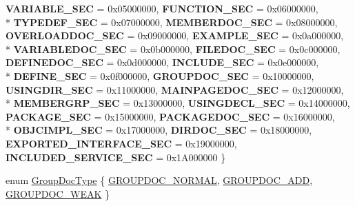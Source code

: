 \begin{DoxyCompactItemize}
{\bfseries V\-A\-R\-I\-A\-B\-L\-E\-\_\-\-S\-E\-C} = 0x05000000, 
{\bfseries F\-U\-N\-C\-T\-I\-O\-N\-\_\-\-S\-E\-C} = 0x06000000, 
\\*
{\bfseries T\-Y\-P\-E\-D\-E\-F\-\_\-\-S\-E\-C} = 0x07000000, 
{\bfseries M\-E\-M\-B\-E\-R\-D\-O\-C\-\_\-\-S\-E\-C} = 0x08000000, 
{\bfseries O\-V\-E\-R\-L\-O\-A\-D\-D\-O\-C\-\_\-\-S\-E\-C} = 0x09000000, 
{\bfseries E\-X\-A\-M\-P\-L\-E\-\_\-\-S\-E\-C} = 0x0a000000, 
\\*
{\bfseries V\-A\-R\-I\-A\-B\-L\-E\-D\-O\-C\-\_\-\-S\-E\-C} = 0x0b000000, 
{\bfseries F\-I\-L\-E\-D\-O\-C\-\_\-\-S\-E\-C} = 0x0c000000, 
{\bfseries D\-E\-F\-I\-N\-E\-D\-O\-C\-\_\-\-S\-E\-C} = 0x0d000000, 
{\bfseries I\-N\-C\-L\-U\-D\-E\-\_\-\-S\-E\-C} = 0x0e000000, 
\\*
{\bfseries D\-E\-F\-I\-N\-E\-\_\-\-S\-E\-C} = 0x0f000000, 
{\bfseries G\-R\-O\-U\-P\-D\-O\-C\-\_\-\-S\-E\-C} = 0x10000000, 
{\bfseries U\-S\-I\-N\-G\-D\-I\-R\-\_\-\-S\-E\-C} = 0x11000000, 
{\bfseries M\-A\-I\-N\-P\-A\-G\-E\-D\-O\-C\-\_\-\-S\-E\-C} = 0x12000000, 
\\*
{\bfseries M\-E\-M\-B\-E\-R\-G\-R\-P\-\_\-\-S\-E\-C} = 0x13000000, 
{\bfseries U\-S\-I\-N\-G\-D\-E\-C\-L\-\_\-\-S\-E\-C} = 0x14000000, 
{\bfseries P\-A\-C\-K\-A\-G\-E\-\_\-\-S\-E\-C} = 0x15000000, 
{\bfseries P\-A\-C\-K\-A\-G\-E\-D\-O\-C\-\_\-\-S\-E\-C} = 0x16000000, 
\\*
{\bfseries O\-B\-J\-C\-I\-M\-P\-L\-\_\-\-S\-E\-C} = 0x17000000, 
{\bfseries D\-I\-R\-D\-O\-C\-\_\-\-S\-E\-C} = 0x18000000, 
{\bfseries E\-X\-P\-O\-R\-T\-E\-D\-\_\-\-I\-N\-T\-E\-R\-F\-A\-C\-E\-\_\-\-S\-E\-C} = 0x19000000, 
{\bfseries I\-N\-C\-L\-U\-D\-E\-D\-\_\-\-S\-E\-R\-V\-I\-C\-E\-\_\-\-S\-E\-C} = 0x1\-A000000
 \}
\item 
enum \hyperlink{class_entry_ac51ac416856cada4f7237ba7da7f3938}{Group\-Doc\-Type} \{ \hyperlink{class_entry_ac51ac416856cada4f7237ba7da7f3938a0ff533df76bb839903674baa032f7954}{G\-R\-O\-U\-P\-D\-O\-C\-\_\-\-N\-O\-R\-M\-A\-L}, 
\hyperlink{class_entry_ac51ac416856cada4f7237ba7da7f3938a78841583472139a970c65120decf9ddf}{G\-R\-O\-U\-P\-D\-O\-C\-\_\-\-A\-D\-D}, 
\hyperlink{class_entry_ac51ac416856cada4f7237ba7da7f3938ab4cca3a9646f958088c5ed9a5799cf4e}{G\-R\-O\-U\-P\-D\-O\-C\-\_\-\-W\-E\-A\-K}
 \}
\end{DoxyCompactItemize}
